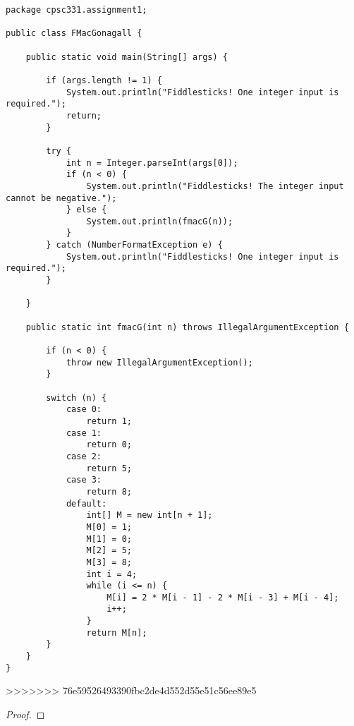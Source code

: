 \documentclass[12pt]{article}
\newenvironment{problem}[2][Problem]{\begin{trivlist}
\item[\hskip \labelsep {\bfseries #1}\hskip \labelsep {\bfseries #2.}]}{\end{trivlist}}
\begin{document}
\begin{problem}{13} $\:$
\begin{Verbatim}[fontsize=\small]
package cpsc331.assignment1;

public class FMacGonagall {

    public static void main(String[] args) {

        if (args.length != 1) {
            System.out.println("Fiddlesticks! One integer input is required.");
            return;
        }

        try {
            int n = Integer.parseInt(args[0]);
            if (n < 0) {
                System.out.println("Fiddlesticks! The integer input cannot be negative.");
            } else {
                System.out.println(fmacG(n));
            }
        } catch (NumberFormatException e) {
            System.out.println("Fiddlesticks! One integer input is required.");
        }

    }

    public static int fmacG(int n) throws IllegalArgumentException {

        if (n < 0) {
            throw new IllegalArgumentException();
        }

        switch (n) {
            case 0:
                return 1;
            case 1:
                return 0;
            case 2:
                return 5;
            case 3:
                return 8;
            default:
                int[] M = new int[n + 1];
                M[0] = 1;
                M[1] = 0;
                M[2] = 5;
                M[3] = 8;
                int i = 4;
                while (i <= n) {
                    M[i] = 2 * M[i - 1] - 2 * M[i - 3] + M[i - 4];
                    i++;
                }
                return M[n];
        }
    }
}
\end{Verbatim}
\end{problem}
>>>>>>> 76e59526493390fbc2de4d552d55e51c56ee89e5


    
\begin{problem}{14}
\end{problem}

\begin{proof}
\end{proof}

 
 
\end{document}
